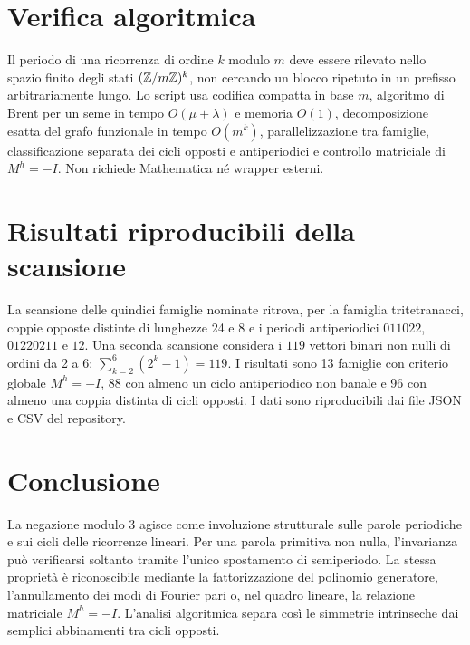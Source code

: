 \documentclass[11pt,a4paper]{article}
\begin{document}
\section{Verifica algoritmica}
Il periodo di una ricorrenza di ordine \(k\) modulo \(m\) deve essere rilevato nello spazio finito degli stati \((\mathbb Z/m\mathbb Z)^k\), non cercando un blocco ripetuto in un prefisso arbitrariamente lungo. Lo script usa codifica compatta in base \(m\), algoritmo di Brent per un seme in tempo \(O(\mu+\lambda)\) e memoria \(O(1)\), decomposizione esatta del grafo funzionale in tempo \(O(m^k)\), parallelizzazione tra famiglie, classificazione separata dei cicli opposti e antiperiodici e controllo matriciale di \(M^h=-I\). Non richiede Mathematica né wrapper esterni.
\section{Risultati riproducibili della scansione}
La scansione delle quindici famiglie nominate ritrova, per la famiglia tritetranacci, coppie opposte distinte di lunghezze 24 e 8 e i periodi antiperiodici \(011022\), \(01220211\) e \(12\). Una seconda scansione considera i \(119\) vettori binari non nulli di ordini da 2 a 6: \(\sum_{k=2}^{6}(2^k-1)=119\). I risultati sono 13 famiglie con criterio globale \(M^h=-I\), 88 con almeno un ciclo antiperiodico non banale e 96 con almeno una coppia distinta di cicli opposti. I dati sono riproducibili dai file JSON e CSV del repository.
\section*{Conclusione}
La negazione modulo 3 agisce come involuzione strutturale sulle parole periodiche e sui cicli delle ricorrenze lineari. Per una parola primitiva non nulla, l’invarianza può verificarsi soltanto tramite l’unico spostamento di semiperiodo. La stessa proprietà è riconoscibile mediante la fattorizzazione del polinomio generatore, l’annullamento dei modi di Fourier pari o, nel quadro lineare, la relazione matriciale \(M^h=-I\). L’analisi algoritmica separa così le simmetrie intrinseche dai semplici abbinamenti tra cicli opposti.
\end{document}
